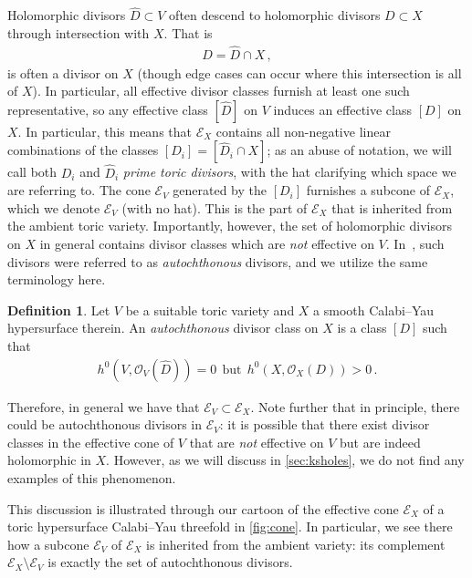 \documentclass[11pt,dvipsnames]{article}
\theoremstyle{definition}
\newtheorem{definition}[theorem]{Definition}
\begin{document}
Holomorphic divisors $\hat{D} \subset V$ often descend to holomorphic divisors $D \subset X$ through intersection with $X$. That is
\begin{align}
    D = \hat{D} \cap X\,,
\end{align}
is often a divisor on $X$ (though edge cases can occur where this intersection is all of $X$). In particular, all effective divisor classes furnish at least one such representative, so any effective class $[\hat{D}]$ on $V$ induces an effective class $[D]$ on $X$. In particular, this means that $\mathcal{E}_X$ contains all non-negative linear combinations of the classes $[D_i] = [\hat{D}_i \cap X]$; as an abuse of notation, we will call both $D_i$ and $\hat{D}_i$ \textit{prime toric divisors}, with the hat clarifying which space we are referring to. The cone $\mathcal{E}_V$ generated by the $[D_i]$ furnishes a subcone of $\mathcal{E}_X$, which we denote $\mathcal{E}_V$ (with no hat). This is the part of $\mathcal{E}_X$ that is inherited from the ambient toric variety. Importantly, however, the set of holomorphic divisors on $X$ in general contains divisor classes which are \textit{not} effective on $V$. In~\cite{Demirtas:2018akl}, such divisors were referred to as \textit{autochthonous} divisors, and we utilize the same terminology here.
\begin{definition}
    Let $V$ be a suitable toric variety and $X$ a smooth Calabi--Yau hypersurface therein. An \textit{autochthonous} divisor class on $X$ is a class $[D]$ such that
    \begin{align}
        h^{0}(V, \mathcal{O}_V(\hat{D})) = 0 \ \ \text{but} \ \ h^{0}(X, \mathcal{O}_X(D)) >0\,.
    \end{align}
\end{definition}
Therefore, in general we have that $\mathcal{E}_V \subset \mathcal{E}_X$. Note further that in principle, there could be autochthonous divisors in $\mathcal{E}_V$: it is possible that there exist divisor classes in the effective cone of $V$ that are \textit{not} effective on $V$ but are indeed holomorphic in $X$. However, as we will discuss in \cref{sec:ksholes}, we do not find any examples of this phenomenon.

This discussion is illustrated through our cartoon of the effective cone $\mathcal{E}_X$ of a toric hypersurface Calabi--Yau threefold in \cref{fig:cone}. In particular, we see there how a subcone $\mathcal{E}_V$ of $\mathcal{E}_X$ is inherited from the ambient variety: its complement $\mathcal{E}_X \setminus \mathcal{E}_V$ is exactly the set of autochthonous divisors. 
\end{document}
